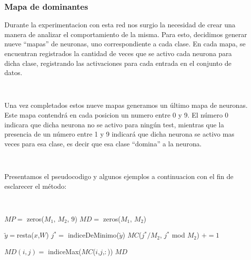 \documentclass[informe.tex]{subfiles}
\begin{document}
	\subsubsection{Mapa de dominantes}
      
	Durante la experimentacion con esta red nos surgio la necesidad de crear una manera de analizar el comportamiento de la misma. Para esto, decidimos generar nueve ``mapas'' de neuronas, uno correspondiente a cada clase. En cada mapa, se encuentran registrados la cantidad de veces que se activo cada neurona para dicha clase, registrando las activaciones para cada entrada en el conjunto de datos.
	
	~
	
	Una vez completados estos nueve mapas generamos un \'ultimo mapa de neuronas. Este mapa contendr\'a en cada posicion un numero entre 0 y 9. El n\'umero 0 indicara que dicha neurona no se activo para ning\'un test, mientras que la presencia de un n\'umero entre 1 y 9 indicar\'a que dicha neurona se activo mas veces para esa clase, es decir que esa clase ``domina'' a la neurona.
	
	~
	
	Presentamos el pseudocodigo y algunos ejemplos a continuacion con el fin de esclarecer el m\'etodo:
	
	~
	
	\begin{algorithmic}
	      \State $MP =$ zeros($M_1$, $M_2$, $9$)
	      \State $MD =$ zeros($M_1$, $M_2$)
	      
		\State $\tilde{y}= $resta($x$,$W$)
		\State $j^* =$ indiceDeMinimo($\tilde{y}$)
		\State $MC$($j^*/M_2$, $j^*$ mod $M_2$) $+= 1$ 
	      \EndFor
	      
		  \State $MD(i,j) =$ indiceMax($MC$($i$,$j$,$:$))
		\EndFor
	      \EndFor
	      \State \Return $MD$
	    \EndFunction
	  \end{algorithmic}
	  
	  
% 
	
\end{document}
